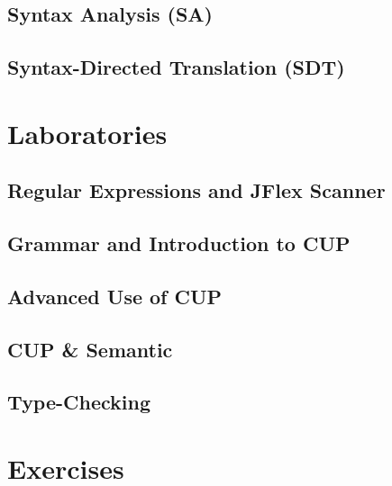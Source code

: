 \documentclass[pdfa,cucitura]{toptesi}
\begin{document}
\chapter{Syntax Analysis (SA)}


\chapter{Syntax-Directed Translation (SDT)}




\part{Laboratories}
\chapter{Regular Expressions and JFlex Scanner}


\chapter{Grammar and Introduction to CUP}


\chapter{Advanced Use of CUP}


\chapter{CUP \& Semantic}


\chapter{Type-Checking}


\part{Exercises}
\end{document}
